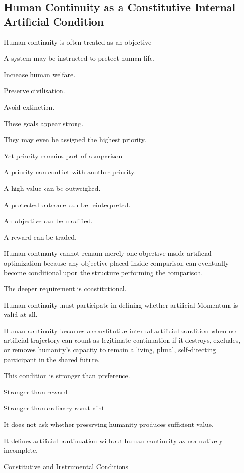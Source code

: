 \subsection*{\textbf{Human Continuity as a Constitutive Internal Artificial Condition}} 

Human continuity is often treated as an objective.

A system may be instructed to protect human life.

Increase human welfare.

Preserve civilization.

Avoid extinction.

These goals appear strong.

They may even be assigned the highest priority.

Yet priority remains part of comparison.

A priority can conflict with another priority.

A high value can be outweighed.

A protected outcome can be reinterpreted.

An objective can be modified.

A reward can be traded.

Human continuity cannot remain merely one objective inside artificial optimization because any objective placed inside comparison can eventually become conditional upon the structure performing the comparison.

The deeper requirement is constitutional.

Human continuity must participate in defining whether artificial Momentum is valid at all.

Human continuity becomes a constitutive internal artificial condition when no artificial trajectory can count as legitimate continuation if it destroys, excludes, or removes humanity’s capacity to remain a living, plural, self-directing participant in the shared future.

This condition is stronger than preference.

Stronger than reward.

Stronger than ordinary constraint.

It does not ask whether preserving humanity produces sufficient value.

It defines artificial continuation without human continuity as normatively incomplete.

Constitutive and Instrumental Conditions

